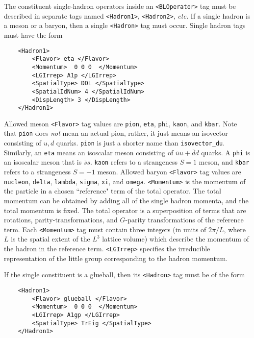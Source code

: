 \documentclass[12pt]{article}
\newcommand{\vb}{\texttt}
\begin{document}
The constituent single-hadron operators inside an \vb{<BLOperator>} tag
must be described in   
separate tags named \vb{<Hadron1>}, \vb{<Hadron2>}, \textit{etc.}  If a single hadron 
is a meson or a baryon, then a single \vb{<Hadron>} tag must occur.
Single hadron tags must have the form    
\begin{verbatim}                
    <Hadron1>                                               
        <Flavor> eta </Flavor>                               
        <Momentum>  0 0 0  </Momentum>                       
        <LGIrrep> A1p </LGIrrep>                             
        <SpatialType> DDL </SpatialType>                     
        <SpatialIdNum> 4 </SpatialIdNum>                     
        <DispLength> 3 </DispLength>                         
    </Hadron1>                                              
\end{verbatim}                                              
Allowed meson \vb{<Flavor>} tag values are \vb{pion}, \vb{eta}, \vb{phi},   
\vb{kaon}, and \vb{kbar}. Note that \vb{pion} does \textit{not} mean an actual  
pion, rather, it just means an isovector consisting of $u,d$    
quarks.  \vb{pion} is just a shorter name than \vb{isovector\_du}.   
Similarly, an \vb{eta} means an isoscalar meson consisting of    
$\overline{u}u+\overline{d}d$ quarks.  A \vb{phi} is an isoscalar meson 
that is $\overline{s}s$.    
\vb{kaon} refers to a strangeness $S=1$ meson, and \vb{kbar} refers   
to a strangeness $S=-1$ meson. Allowed baryon \vb{<Flavor>} tag      
values are \vb{nucleon}, \vb{delta}, \vb{lambda}, \vb{sigma}, \vb{xi}, and   
\vb{omega}.  \vb{<Momentum>} is the momentum of the particle          
in a chosen ``reference" term of the total operator.  The      
total momentum can be obtained by adding all of the single    
hadron momenta, and the total momentum is fixed.  The total   
operator is a superposition of terms that are rotations,      
parity-transformations, and $G$-parity transformations of the   
reference term. Each \vb{<Momentum>} tag must contain three        
integers (in units of $2\pi/L$, where $L$ is the spatial extent of the
$L^3$ lattice volume) which describe the momentum     
of the hadron in the reference term. \vb{<LGIrrep>} specifies the  
irreducible representation of the little group corresponding  
to the hadron momentum.                                       
                                                              
If the single constituent is a glueball, then its \vb{<Hadron>}    
tag must be of the form                                       
\begin{verbatim}
    <Hadron1>                                               
        <Flavor> glueball </Flavor>                          
        <Momentum>  0 0 0  </Momentum>                       
        <LGIrrep> A1gp </LGIrrep>                            
        <SpatialType> TrEig </SpatialType>                   
    </Hadron1>                                              
\end{verbatim}
\end{document}
